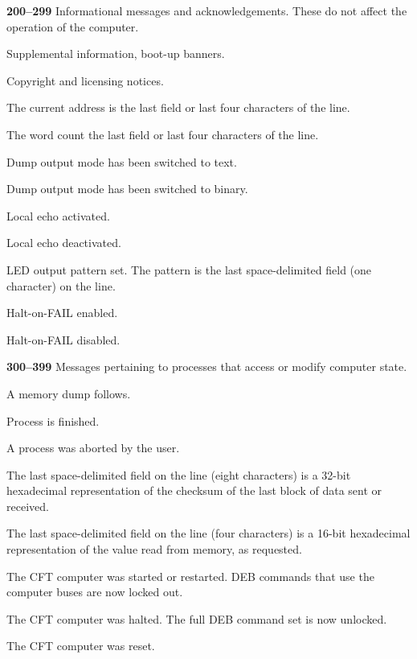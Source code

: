\begin{description}
\item{\bfseries 200–299} Informational messages and acknowledgements. These
  do not affect the operation of the computer.
  \begin{description}
  \item{\bfseries{}} Supplemental information, boot-up banners.
  \item{\bfseries{}} Copyright and licensing notices.
  \item{\bfseries{}} The current address is the last field or last four
    characters of the line.
  \item{\bfseries{}} The word count the last field or last four characters
    of the line.
  \item{\bfseries{}} Dump output mode has been switched to text.
  \item{\bfseries{}} Dump output mode has been switched to binary.
  \item{\bfseries{}} Local echo activated.
  \item{\bfseries{}} Local echo deactivated.
  \item{\bfseries{}} LED output pattern set. The pattern is
    the last space-delimited field (one character) on the line.
  \item{\bfseries{}} Halt-on-FAIL enabled.
  \item{\bfseries{}} Halt-on-FAIL disabled.
  \end{description}
  
\item{\bfseries 300–399} Messages pertaining to processes that access or
  modify computer state.
  \begin{description}
  \item{\bfseries{}} A memory dump follows.
  \item{\bfseries{}} Process is finished.
  \item{\bfseries{}} A process was aborted by the user.
  \item{\bfseries{}} The last space-delimited field on
    the line (eight characters) is a 32-bit hexadecimal representation of the
    checksum of the last block of data sent or received.
  \item{\bfseries{}} The last space-delimited field on the
    line (four characters) is a 16-bit hexadecimal representation of
    the value read from memory, as requested.
  \item{\bfseries{}} The CFT computer was started or
    restarted. \gls{DEB} commands that use the computer buses are now
    locked out.
  \item{\bfseries{}} The CFT computer was halted. The
    full \gls{DEB} command set is now unlocked.
  \item{\bfseries{}} The CFT computer was reset.
  \end{description}
  

\end{description}
